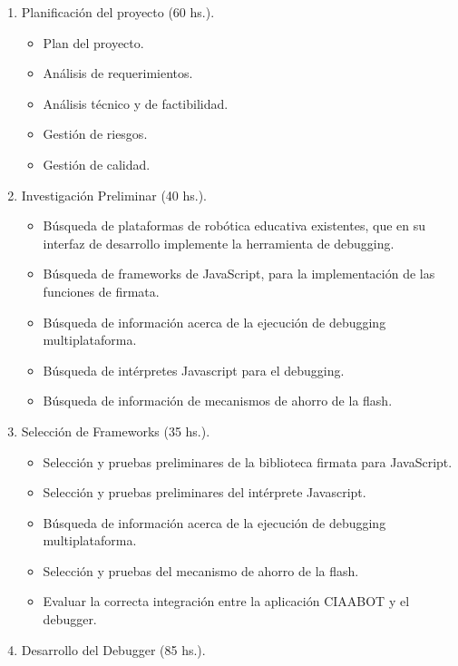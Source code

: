 \begin{enumerate}
	\item Planificación del proyecto (60 hs.).
	
	\begin{itemize}
		\item Plan del proyecto.
		\item Análisis de requerimientos.
		\item Análisis técnico y de factibilidad.
		\item Gestión de riesgos.
		\item Gestión de calidad.
	\end{itemize}

	\item Investigación Preliminar (40 hs.).
	
	\begin{itemize}
		\item Búsqueda de plataformas de robótica educativa existentes, que en su interfaz de desarrollo implemente la herramienta de debugging.
		\item Búsqueda de frameworks de JavaScript, para la implementación de las funciones de firmata.
		\item Búsqueda de información acerca de la ejecución de debugging multiplataforma.
		\item Búsqueda de intérpretes Javascript para el debugging.
		\item Búsqueda de información de mecanismos de ahorro de la flash.
	\end{itemize}

	\item Selección de Frameworks (35 hs.).
	
	\begin{itemize}
		\item Selección y pruebas preliminares de la biblioteca firmata para JavaScript.
		\item Selección y pruebas preliminares del intérprete Javascript.
		\item Búsqueda de información acerca de la ejecución de debugging multiplataforma.
		\item Selección y pruebas del mecanismo de ahorro de la flash.
		\item Evaluar la correcta integración entre la aplicación CIAABOT y el debugger.
	\end{itemize}
	
	\item Desarrollo del Debugger (85 hs.).
	

\end{enumerate}
